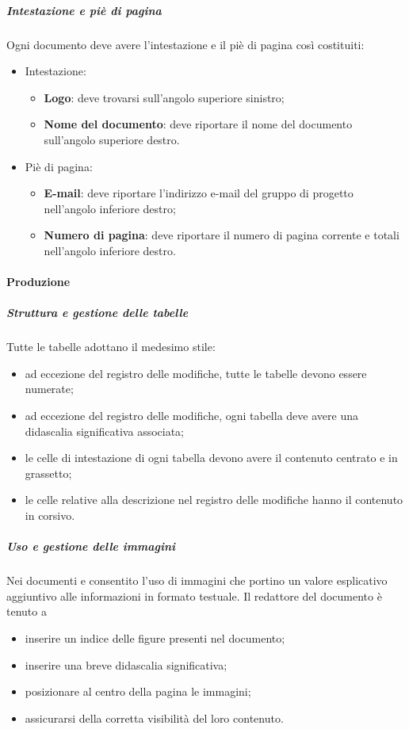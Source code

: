   \subparagraph*{Intestazione e piè di pagina}
	Ogni documento deve avere l'intestazione e il piè di pagina così costituiti:
	\begin{itemize}
		\item Intestazione:
		\begin{itemize}
			\item \textbf{Logo}: deve trovarsi sull'angolo superiore sinistro;
			\item \textbf{Nome del documento}: deve riportare il nome del documento sull'angolo superiore destro.
		\end{itemize}
		\item Piè di pagina:
		\begin{itemize}
			\item \textbf{E-mail}: deve riportare l'indirizzo e-mail del gruppo di progetto
			nell'angolo inferiore destro;
			\item \textbf{Numero di pagina}: deve riportare il numero di pagina corrente e totali
			nell'angolo inferiore destro.
		\end{itemize}
	\end{itemize}

  \paragraph{Produzione}
  \subparagraph*{Struttura e gestione delle tabelle}
  Tutte le tabelle adottano il medesimo stile:
  \begin{itemize}
  	\item ad eccezione del registro delle modifiche, tutte le tabelle devono essere numerate;
  	\item ad eccezione del registro delle modifiche, ogni tabella deve avere una didascalia significativa associata;
  	\item le celle di intestazione di ogni tabella devono avere il contenuto centrato e in grassetto;
  	\item le celle relative alla descrizione nel registro delle modifiche hanno il contenuto in corsivo.
  \end{itemize}

  \subparagraph*{Uso e gestione delle immagini}
  Nei documenti e consentito l'uso di immagini che portino un valore esplicativo
  aggiuntivo alle informazioni in formato testuale. Il redattore del documento è tenuto a
  \begin{itemize}
  	\item inserire un indice delle figure presenti nel documento;
  	\item inserire una breve didascalia significativa;
  	\item posizionare al centro della pagina le immagini;
  	\item assicurarsi della corretta visibilità del loro contenuto.
  \end{itemize}  

